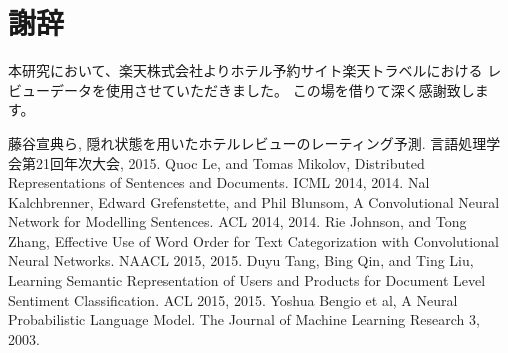 \documentclass[twocolumn,a4paper]{ltjarticle}
\begin{document}
\section*{謝辞}
本研究において、楽天株式会社よりホテル予約サイト楽天トラベルにおける
レビューデータを使用させていただきました。
この場を借りて深く感謝致します。




\begin{thebibliography}{9}
  藤谷宣典ら,
  隠れ状態を用いたホテルレビューのレーティング予測.
  言語処理学会第21回年次大会, 2015.
  Quoc Le, and Tomas Mikolov,
  Distributed Representations of Sentences and Documents.
  ICML 2014, 2014.
  Nal Kalchbrenner, Edward Grefenstette, and Phil Blunsom,
  A Convolutional Neural Network for Modelling Sentences.
  ACL 2014, 2014.
  Rie Johnson, and Tong Zhang,
  Effective Use of Word Order for Text Categorization
  with Convolutional Neural Networks.
  NAACL 2015, 2015.
  Duyu Tang, Bing Qin, and Ting Liu,
  Learning Semantic Representation of Users and Products
  for Document Level Sentiment Classification.
  ACL 2015, 2015.
  Yoshua Bengio et al,
  A Neural Probabilistic Language Model.
  The Journal of Machine Learning Research 3, 2003.
\end{thebibliography}
\end{document}
